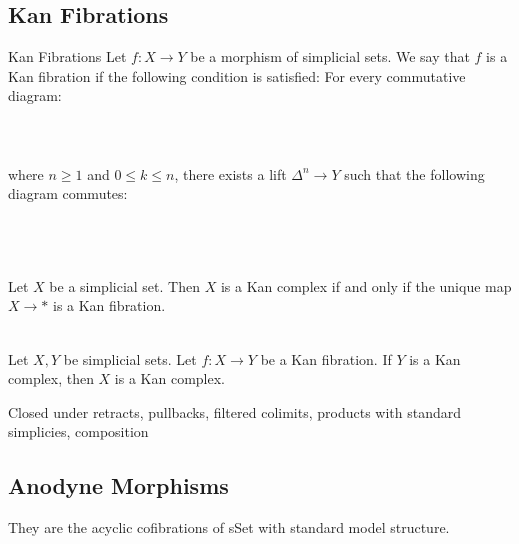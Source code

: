 \documentclass[a4paper]{article}
\begin{document}
\subsection{Kan Fibrations}
\begin{defn}{Kan Fibrations}{} Let $f:X\to Y$ be a morphism of simplicial sets. We say that $f$ is a Kan fibration if the following condition is satisfied: For every commutative diagram: \\~\\
\\~\\
where $n\geq 1$ and $0\leq k\leq n$, there exists a lift $\Delta^n\to Y$ such that the following diagram commutes: \\~\\
\\~\\
\end{defn}

\begin{lmm}{}{} Let $X$ be a simplicial set. Then $X$ is a Kan complex if and only if the unique map $X\to\ast$ is a Kan fibration. 
\end{lmm}

\begin{prp}{}{}\\
Let $X,Y$ be simplicial sets. Let $f:X\to Y$ be a Kan fibration. If $Y$ is a Kan complex, then $X$ is a Kan complex. 
\end{prp}

Closed under retracts, pullbacks, filtered colimits, products with standard simplicies, composition

\subsection{Anodyne Morphisms}
They are the acyclic cofibrations of sSet with standard model structure. 
\end{document}
